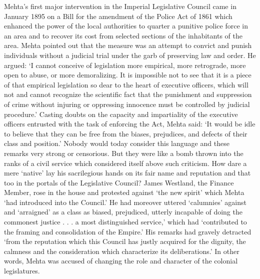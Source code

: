 Mehta’s first major intervention in the Imperial Legislative Council came in January 1895 on a Bill for the amendment of the Police Act of 1861 which enhanced the power of the local authorities to quarter a punitive police force in an area and to recover its cost from selected sections of the inhabitants of the area. Mehta pointed out that the measure was an attempt to convict and punish individuals without a judicial trial under the garb of preserving law and order. He argued: ‘I cannot conceive of legislation more empirical, more retrograde, more open to abuse, or more demoralizing. It is impossible not to see that it is a piece of that empirical legislation so dear to the heart of executive officers, which will not and cannot recognize the scientific fact that the punishment and suppression of crime without injuring or oppressing innocence must be controlled by judicial procedure.’ Casting doubts on the capacity and impartiality of the executive officers entrusted with the task of enforcing the Act, Mehta said: ‘It would be idle to believe that they can be free from the biases, prejudices, and defects of their class and position.’ Nobody would today consider this language and these remarks very strong or censorious. But they were like a bomb thrown into the ranks of a civil service which considered itself above such criticism. How dare a mere ‘native’ lay his sacrilegious hands on its fair name and reputation and that too in the portals of the Legislative Council? James Westland, the Finance Member, rose in the house and protested against ‘the new spirit’ which Mehta ‘had introduced into the Council.’ He had moreover uttered ‘calumnies’ against and ‘arraigned’ as a class as biased, prejudiced, utterly incapable of doing the commonest justice . . . a most distinguished service,’ which had ‘contributed to the framing and consolidation of the Empire.’ His remarks had gravely detracted ‘from the reputation which this Council has justly acquired for the dignity, the calmness and the consideration which characterize its deliberations.’ In other words, Mehta was accused of changing the role and character of the colonial legislatures.

